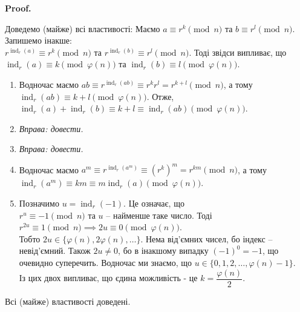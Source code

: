 \documentclass[a4paper, 10pt]{article}
\makeatletter
\theoremstyle{theoremdd}
\theoremstyle{theoremdd}
\theoremstyle{theoremdd}
\theoremstyle{theoremdd}
\theoremstyle{theoremdd}
\theoremstyle{theoremdd}
\newtheorem{remark}[theorem]{Remark}
\theoremstyle{theoremdd}
\theoremstyle{theoremdd}
\def\rightproof{$\boxed{\Rightarrow}$ }
\renewenvironment{proof}[1][Proof.\\]{\par
\pushQED{\hfill \qed}%
\normalfont \topsep6\p@\@plus6\p@\relax
\trivlist
\item\relax
{\bfseries
#1\@addpunct{.}}\hspace\labelsep\ignorespaces
}{%
\popQED\endtrivlist\@endpefalse
}
\DeclareMathOperator{\ord}{ord}
\DeclareMathOperator{\ind}{ind}
\makeatother
\begin{document}
\begin{proof}
Доведемо (майже) всі властивості:
Маємо $a \equiv r^k \pmod n$ та $b \equiv r^l \pmod n$. Запишемо інакше:\\
$r^{\ind_r(a)} \equiv r^k \pmod n$ та $r^{\ind_r(b)} \equiv r^l \pmod n$. Тоді звідси випливає, що\\
$\ind_r(a) \equiv k \pmod {\varphi(n)}$ та $\ind_r(b) \equiv l \pmod {\varphi(n)}$.
\begin{enumerate}[wide=0pt,label={\arabic*)}]
\item Водночас маємо $ab \equiv r^{\ind_r(ab)} \equiv r^k r^l = r^{k+l} \pmod n$, а тому \\ $\ind_r(ab) \equiv k+l \pmod {\varphi(n)}$. Отже,\\
$\ind_r(a) + \ind_r(b) \equiv k+l \equiv \ind_r(ab) \pmod {\varphi(n)}$.

\item \textit{Вправа: довести.} \item \textit{Вправа: довести.}

\item Водночас маємо $a^m \equiv r^{\ind_r(a^m)} \equiv (r^k)^m = r^{km} \pmod n$, а тому \\
$\ind_r(a^m) \equiv km \equiv m \ind_r(a) \pmod {\varphi(n)}$.

\item Позначимо $u = \ind_r(-1)$. Це означає, що \\
$r^u \equiv -1 \pmod n$ та $u$ -- найменше таке число. Тоді\\
$r^{2u} \equiv 1 \pmod n \implies 2u \equiv 0 \pmod {\varphi(n)}$.\\
Тобто $2u \in \{\varphi(n),2\varphi(n),\dots\}$. Нема від'ємних чисел, бо індекс -- невід'ємний. Також $2u \neq 0$, бо в інакшому випадку $(-1)^0 = -1$, що очевидно суперечить. Водночас ми знаємо, що $u \in \{0,1,2,\dots,\varphi(n)-1\}$.\\
Із цих двох випливає, що єдина можливість - це $k = \dfrac{\varphi(n)}{2}$.
\end{enumerate}
Всі (майже) властивості доведені.
\end{proof}

\iffalse
\begin{remark}
Окремо поясню, що $\ord_{2^{n}} (5) = 2^{n-2} \iff \begin{cases} 2^n \mid 5^{2^{n-2}}-1 \\ 2^{n+1} \nmid 5^{2^{n-2}} - 1 \end{cases}$, бо щось довго з цим мучався.\\
\rightproof Дано: $\ord_{2^n}(5) = 2^{n-2}$, тобто $5^{2^{n-2}} \equiv 1 \pmod {2^n}$. Тоді очевидно маємо перший рядок системи.\\
!Нехай $2^{n+1} \mid 5^{2^{n-2}}-1$, тоді звідси $5^{2^{n-2}} \equiv 1 \pmod {2^{n+1}}$. Тоді звідси $\ord_{2^{n+1}}(5) \mid 2^{n-2}$.\\
Водночас $5^{\ord_{2^{n+1}}(5)} \equiv 1 \pmod {2^n}$, тож звідси $2^{n-2} \mid \ord_{2^{n+1}}(5)$, тобто \\ $\ord_{2^{n+1}}(5) = 2^{n-2}$.
\end{remark}
\fi
\end{document}
